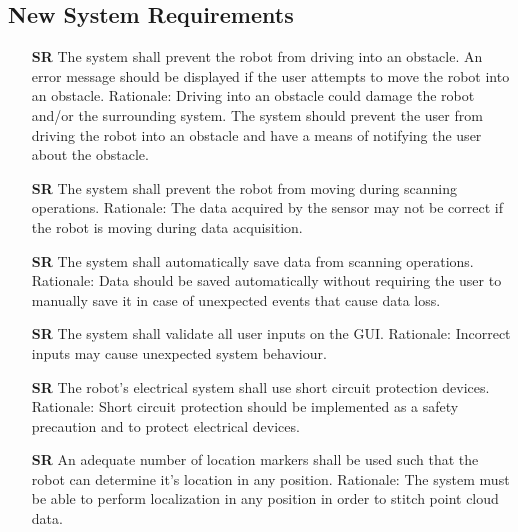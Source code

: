\documentclass[12pt]{article}
\newcounter{srnum} %
\begin{document}
\subsection{New System Requirements}

\begin{itemize}

\item[\textbf{SR\refstepcounter{srnum}\thesrnum \label{SR1}}] The system shall prevent the robot from driving into an obstacle. An error message should be displayed if the user attempts to move the robot into an obstacle.
\newline Rationale: Driving into an obstacle could damage the robot and/or the surrounding system. The system should prevent the user from driving the robot into an obstacle and have a means of notifying the user about the obstacle.

\item[\textbf{SR\refstepcounter{srnum}\thesrnum \label{SR2}}] The system shall prevent the robot from moving during scanning operations.
\newline Rationale: The data acquired by the sensor may not be correct if the robot is moving during data acquisition.

\item[\textbf{SR\refstepcounter{srnum}\thesrnum \label{SR3}}] The system shall automatically save data from scanning operations.
\newline Rationale: Data should be saved automatically  without requiring the user to manually save it in case of unexpected events that cause data loss.

\item[\textbf{SR\refstepcounter{srnum}\thesrnum \label{SR5}}] The system shall validate all user inputs on the GUI.
\newline Rationale: Incorrect inputs may cause unexpected system behaviour.

\item[\textbf{SR\refstepcounter{srnum}\thesrnum \label{SR6}}] The robot's electrical system shall use short circuit protection devices.
\newline Rationale: Short circuit protection should be implemented as a safety precaution and to protect electrical devices.

\item[\textbf{SR\refstepcounter{srnum}\thesrnum \label{SR7}}] An adequate number of location markers shall be used such that the robot can determine it's location in any position.
\newline Rationale: The system must be able to perform localization in any position in order to stitch point cloud data.


\end{itemize}
\end{document}
